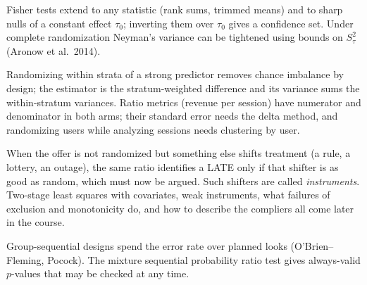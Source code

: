 \documentclass[11pt]{article}
\begin{document}
\sectionthree

\begin{extension}
Fisher tests extend to any statistic (rank sums, trimmed means) and to sharp nulls of a constant effect
$\tau_0$; inverting them over $\tau_0$ gives a confidence set. Under complete randomization Neyman's
variance can be tightened using bounds on $S_\tau^2$ (Aronow et al.\ 2014).
\end{extension}

\begin{extension}
Randomizing within strata of a strong predictor removes chance imbalance by design; the estimator is the
stratum-weighted difference and its variance sums the within-stratum variances. Ratio metrics (revenue per
session) have numerator and denominator in both arms; their standard error needs the delta method, and
randomizing users while analyzing sessions needs clustering by user.
\end{extension}

\begin{extension}
When the offer is not randomized but something else shifts treatment (a rule, a lottery, an outage), the same
ratio identifies a LATE only if that shifter is as good as random, which must now be argued. Such shifters are
called \emph{instruments}. Two-stage least squares with covariates, weak instruments, what failures of exclusion
and monotonicity do, and how to describe the compliers all come later in the course.
\end{extension}

\begin{extension}
Group-sequential designs spend the error rate over planned looks (O'Brien--Fleming, Pocock). The mixture
sequential probability ratio test gives always-valid $p$-values that may be checked at any time.
\end{extension}
\end{document}
